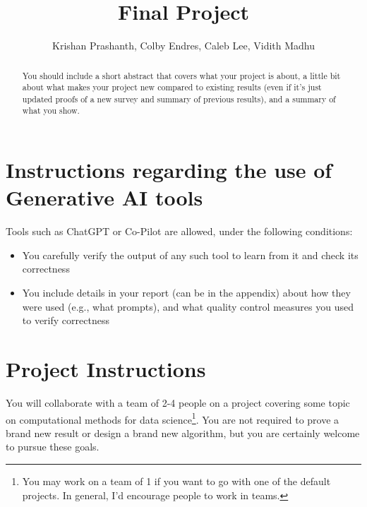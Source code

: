 \documentclass{article}
\title{Final Project}
\author{%
Krishan Prashanth, Colby Endres, Caleb Lee, Vidith Madhu
}
\begin{document}
	
	\maketitle
	
	\begin{abstract}
		You should include a short abstract that covers what your project is about, a little bit about what makes your project new compared to existing results (even if it's just updated proofs of a new survey and summary of previous results), and a summary of what you show.
	\end{abstract}

	\section{Instructions regarding the use of Generative AI tools}
	Tools such as ChatGPT or Co-Pilot are allowed, under the following conditions:
	\begin{itemize}
		\item You carefully verify the output of any such tool to learn from it and check its correctness
		\item You include details in your report (can be in the appendix) about how they were used (e.g., what prompts), and what quality control measures you used to verify correctness 
	\end{itemize}
	


	
%	
	\section{Project Instructions}
	You will collaborate with a team of 2-4 people on a project covering some topic on computational methods for data science\footnote{You may work on a team of 1 if you want to go with one of the default projects. In general, I'd encourage people to work in teams.}. You are not required to prove a brand new result or design a brand new algorithm, but you are certainly welcome to pursue these goals. 
	
\end{document}
